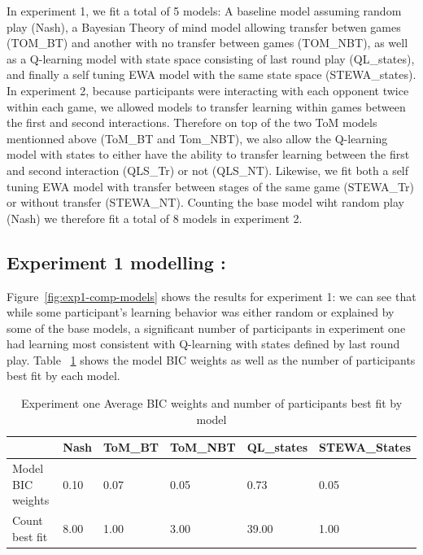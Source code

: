 \documentclass[man,floatsintext]{apa6}
\begin{document}
In experiment 1, we fit a total of 5 models: A baseline model assuming random play (Nash), a Bayesian Theory of mind model allowing transfer betwen games (TOM\_BT) and another with no transfer between games (TOM\_NBT), as well as a Q-learning model with state space consisting of last round play (QL\_states), and finally a self tuning EWA model with the same state space (STEWA\_states). In experiment 2, because participants were interacting with each opponent twice within each game, we allowed models to transfer learning within games between the first and second interactions. Therefore on top of the two ToM models mentionned above (ToM\_BT and Tom\_NBT), we also allow the Q-learning model with states to either have the ability to transfer learning between the first and second interaction (QLS\_Tr) or not (QLS\_NT). Likewise, we fit both a self tuning EWA model with transfer between stages of the same game (STEWA\_Tr) or without transfer (STEWA\_NT). Counting the base model wiht random play (Nash) we therefore fit a total of 8 models in experiment 2.

\hypertarget{experiment-1-modelling}{%
\subsection{Experiment 1 modelling :}\label{experiment-1-modelling}}

Figure~\ref{fig:exp1-comp-models} shows the results for experiment 1: we can see that while some participant's learning behavior was either random or explained by some of the base models, a significant number of participants in experiment one had learning most consistent with Q-learning with states defined by last round play.
Table ~\ref{tab:exp1weightstable} shows the model BIC weights as well as the number of participants best fit by each model.

\begin{table}[tbp]
\begin{center}
\begin{threeparttable}
\caption{\label{tab:exp1weightstable}Experiment one Average BIC weights and number of participants best fit by model}
\begin{tabular}{llllll}
\toprule
 & \multicolumn{1}{c}{Nash} & \multicolumn{1}{c}{ToM\_BT} & \multicolumn{1}{c}{ToM\_NBT} & \multicolumn{1}{c}{QL\_states} & \multicolumn{1}{c}{STEWA\_States}\\
\midrule
Model BIC weights & 0.10 & 0.07 & 0.05 & 0.73 & 0.05\\
Count best fit & 8.00 & 1.00 & 3.00 & 39.00 & 1.00\\
\bottomrule
\end{tabular}
\end{threeparttable}
\end{center}
\end{table}
\end{document}
